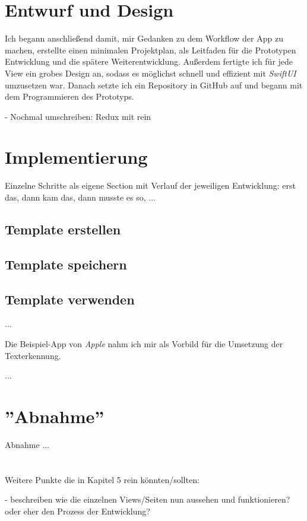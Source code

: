 \documentclass[nomenclature, 150]{HSMW-Thesis}
\begin{document}
	
	\section{Entwurf und Design}
		Ich begann anschließend damit, mir Gedanken zu dem Workflow der App zu machen, erstellte einen minimalen Projektplan, als Leitfaden für die Prototypen Entwicklung und die spätere Weiterentwicklung. Außerdem fertigte ich für jede View ein grobes Design an, sodass es möglichst schnell und effizient mit \textit{SwiftUI} umzusetzen war. Danach setzte ich ein Repository in GitHub auf und begann mit dem Programmieren des Prototyps. 
		
		- Nochmal umschreiben: Redux mit rein	
	\section{Implementierung}
		
		Einzelne Schritte als eigene Section mit Verlauf der jeweiligen Entwicklung: erst das, dann kam das, dann musste es so, ...
			
		\subsection{Template erstellen}
		
		\subsection{Template speichern}
		
		\subsection{Template verwenden}
		
		...
		
		Die Beispiel-App von \textit{Apple} nahm ich mir als Vorbild für die Umsetzung der Texterkennung.
		
		...
		
	\section{''Abnahme''}	
		Abnahme ... \\ \\ \\
	
	
	Weitere Punkte die in Kapitel 5 rein könnten/sollten: 
	
	- beschreiben wie die einzelnen Views/Seiten nun aussehen und funktionieren? oder eher den Prozess der Entwicklung?
	
\end{document}
